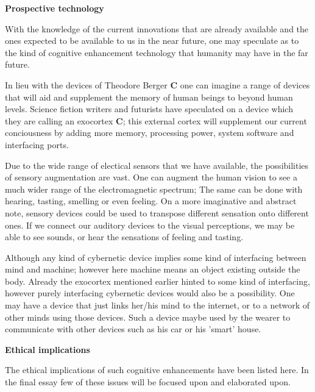 {\bf Prospective technology}

With the knowledge of the current innovations that are already available and the ones expected to be available to us in the near future, one may speculate as to the kind of cognitive enhancement technology that humanity may have in the far future.

In lieu with the devices of Theodore Berger {\bf C} one can imagine a range of devices that will aid and supplement the memory of human beings to beyond human levels. Science fiction writers and futurists have speculated on a device which they are calling an exocortex {\bf C}; this external cortex will supplement our current conciousness by adding more memory, processing power, system software and interfacing ports.

Due to the wide range of electical sensors that we have available, the possibilities of sensory augmentation are vast. One can augment the human vision to see a much wider range of the electromagnetic spectrum; The same can be done with hearing, tasting, smelling or even feeling. On a more imaginative and abstract note, sensory devices could be used to transpose different sensation onto different ones. If we connect our auditory devices to the visual perceptions, we may be able to see sounds, or hear the sensations of feeling and tasting.

Although any kind of cybernetic device implies some kind of interfacing between mind and machine; however here machine means an object existing outside the body. Already the exocortex mentioned earlier hinted to some kind of interfacing, however purely interfacing cybernetic devices would also be a possibility. One may have a device that just links her/his mind to the internet, or to a network of other minds using those devices. Such a device maybe used by the wearer to communicate with other devices such as his car or his 'smart' house. 

{\bf Ethical implications}

The ethical implications of such cognitive enhancements have been listed here. In the final essay few of these issues will be focused upon and elaborated upon.

